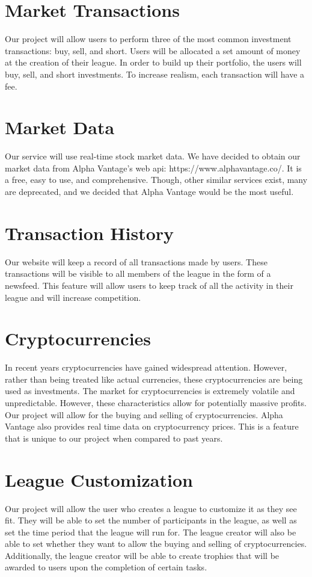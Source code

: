 \documentclass[11pt,letterpaper,oneside]{memoir}
\begin{document}
\section{Market Transactions}
Our project will allow users to perform three of the most common investment transactions: buy, sell, and short. Users will be allocated a set amount of money at the creation of their league. In order to build up their portfolio, the users will buy, sell, and short investments. To increase realism, each transaction will have a fee.

\section{Market Data}
Our service will use real-time stock market data. We have decided to obtain our market data from Alpha Vantage’s web api: https://www.alphavantage.co/. It is a free, easy to use, and comprehensive. Though, other similar services exist, many are deprecated, and we decided that Alpha Vantage would be the most useful. 

\section{Transaction History}

Our website will keep a record of all transactions made by users. These transactions will be visible to all members of the league in the form of a newsfeed. This feature will allow users to keep track of all the activity in their league and will increase competition. 

\section{Cryptocurrencies}

In recent years cryptocurrencies have gained widespread attention. However, rather than being treated like actual currencies, these cryptocurrencies are being used as investments. The market for cryptocurrencies is extremely volatile and unpredictable. However, these characteristics allow for potentially massive profits. Our project will allow for the buying and selling of cryptocurrencies. Alpha Vantage also provides real time data on cryptocurrency prices. This is a feature that is unique to our project when compared to past years. 

\section{League Customization}
Our project will allow the user who creates a league to customize it as they see fit. They will be able to set the number of participants in the league, as well as set the time period that the league will run for. The league creator will also be able to set whether they want to allow the buying and selling of cryptocurrencies. Additionally, the league creator will be able to create trophies that will be awarded to users upon the completion of certain tasks.
\end{document}
